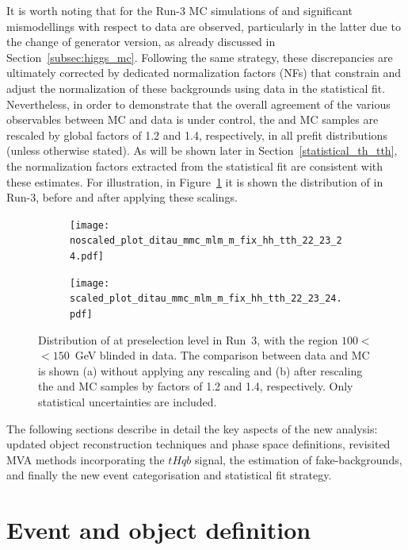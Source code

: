 It is worth noting that for the Run-3 MC simulations of \ttbar and \ztautau significant mismodellings with respect to data are observed, particularly in the latter due to the change of generator version, as already discussed in Section~\ref{subsec:higgs_mc}. 
Following the same strategy, these discrepancies are ultimately corrected by dedicated normalization factors (NFs) that constrain and adjust the normalization of these backgrounds using data in the statistical fit. 
Nevertheless, in order to demonstrate that the overall agreement of the various observables between MC and data is under control, the \ttbar and \ztautau MC samples are rescaled by global factors of 1.2 and 1.4, respectively, in all prefit distributions (unless otherwise stated). 
As will be shown later in Section~\ref{statistical_th_tth}, the normalization factors extracted from the statistical fit are consistent with these estimates. 
For illustration, in Figure~\ref{mmc_scaled} it is shown the distribution of \mmc in Run-3, before and after applying these scalings.

\begin{figure}[htbp]
    \centering
    \begin{subfigure}[b]{0.49\textwidth}
      \centering
      \texttt{[image: noscaled\_plot\_ditau\_mmc\_mlm\_m\_fix\_hh\_tth\_22\_23\_24.pdf]}
      \caption{}
    \end{subfigure}
    \hfill
    \begin{subfigure}[b]{0.49\textwidth}
      \centering
      \texttt{[image: scaled\_plot\_ditau\_mmc\_mlm\_m\_fix\_hh\_tth\_22\_23\_24.pdf]}
      \caption{}
    \end{subfigure}
    \caption{
      Distribution of \mmc at preselection level in Run~3, with the region $100<$\mmc$<150$~GeV blinded in data. 
      The comparison between data and MC is shown (a) without applying any rescaling and (b) after rescaling the \ttbar and \ztautau MC samples by factors of 1.2 and 1.4, respectively. Only statistical uncertainties are included.
    }
    \label{mmc_scaled}
  \end{figure}
  
The following sections describe in detail the key aspects of the new analysis: updated object reconstruction techniques and phase space definitions, revisited MVA methods incorporating the $tHqb$ signal, the estimation of fake-\tauhad backgrounds, and finally the new event categorisation and statistical fit strategy.


\section{Event and object definition}

